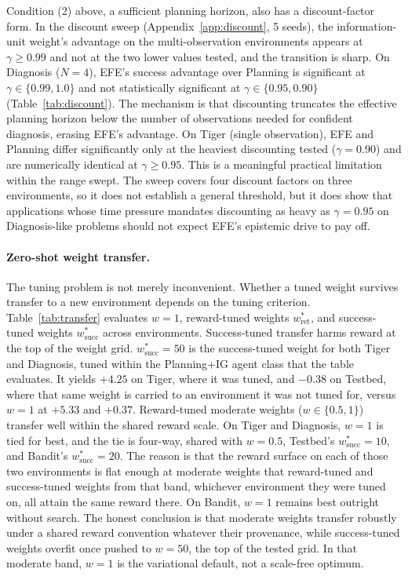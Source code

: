 Condition (2) above, a sufficient planning horizon, also has a discount-factor form. In the discount sweep (Appendix~\ref{app:discount}, 5 seeds), the information-unit weight's advantage on the multi-observation environments appears at $\gamma \geq 0.99$ and not at the two lower values tested, and the transition is sharp. On Diagnosis ($N{=}4$), EFE's success advantage over Planning is significant at $\gamma \in \{0.99, 1.0\}$ and not statistically significant at $\gamma \in \{0.95, 0.90\}$ (Table~\ref{tab:discount}). The mechanism is that discounting truncates the effective planning horizon below the number of observations needed for confident diagnosis, erasing EFE's advantage. On Tiger (single observation), EFE and Planning differ significantly only at the heaviest discounting tested ($\gamma{=}0.90$) and are numerically identical at $\gamma \geq 0.95$. This is a meaningful practical limitation within the range swept. The sweep covers four discount factors on three environments, so it does not establish a general threshold, but it does show that applications whose time pressure mandates discounting as heavy as $\gamma{=}0.95$ on Diagnosis-like problems should not expect EFE's epistemic drive to pay off.

\paragraph{Zero-shot weight transfer.}
The tuning problem is not merely inconvenient. Whether a tuned weight survives transfer to a new environment depends on the tuning criterion. Table~\ref{tab:transfer} evaluates $w{=}1$, reward-tuned weights $w^*_{\mathrm{ret}}$, and success-tuned weights $w^*_{\mathrm{succ}}$ across environments. Success-tuned transfer harms reward at the top of the weight grid. $w^*_{\mathrm{succ}}{=}50$ is the success-tuned weight for both Tiger and Diagnosis, tuned within the Planning+IG agent class that the table evaluates. It yields $+4.25$ on Tiger, where it was tuned, and $-0.38$ on Testbed, where that same weight is carried to an environment it was not tuned for, versus $w{=}1$ at $+5.33$ and $+0.37$. Reward-tuned moderate weights ($w\in\{0.5,1\}$) transfer well within the shared reward scale. On Tiger and Diagnosis, $w{=}1$ is tied for best, and the tie is four-way, shared with $w{=}0.5$, Testbed's $w^*_{\mathrm{succ}}{=}10$, and Bandit's $w^*_{\mathrm{succ}}{=}20$. The reason is that the reward surface on each of those two environments is flat enough at moderate weights that reward-tuned and success-tuned weights from that band, whichever environment they were tuned on, all attain the same reward there. On Bandit, $w{=}1$ remains best outright without search. The honest conclusion is that moderate weights transfer robustly under a shared reward convention whatever their provenance, while success-tuned weights overfit once pushed to $w{=}50$, the top of the tested grid. In that moderate band, $w{=}1$ is the variational default, not a scale-free optimum.

